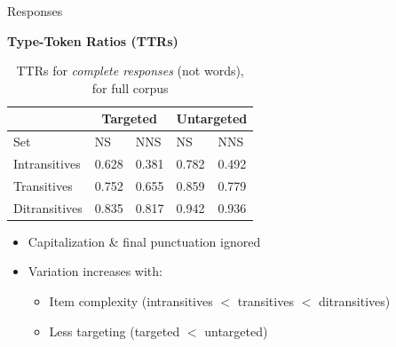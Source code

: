 \documentclass[final,14pt,t]{beamer}
\begin{document}
\begin{frame}{}
\begin{columns}[t]
\begin{column}{.33\linewidth}
\begin{minipage}[t][\textheight]{\linewidth}
\begin{block}{Responses}
\begin{center}
\begin{minipage}{.85\textwidth}
\vspace{1.3em}

\begin{center}
  \textbf{Type-Token Ratios (TTRs)}
\end{center}

\begin{table}[h!]
\begin{center}
\setlength{\tabcolsep}{0.65em}
\begin{tabular}{|l||l|l||l|l|}
\hline
 & \multicolumn{2}{|c||}{Targeted} & \multicolumn{2}{|c|}{Untargeted} \\
\hline
 Set & NS & NNS & NS & NNS \\
\hline
\hline
Intransitives & 0.628 & 0.381 & 0.782 & 0.492 \\
\hline
Transitives & 0.752 & 0.655 & 0.859 & 0.779 \\
\hline
Ditransitives & 0.835 & 0.817 & 0.942 & 0.936 \\ 
\hline
\end{tabular}
\caption{\label{tab:ttr} TTRs for \textit{complete responses} (not words), for full corpus}
\end{center}
\end{table}

\begin{itemize}
\item Capitalization \& final punctuation ignored
\vspace{.3em}
\item Variation increases with:
  \begin{itemize}
  \vspace{.3em}
  \item Item complexity (intransitives $<$ transitives $<$ ditransitives)
  \vspace{.3em}
  \item Less targeting (targeted $<$ untargeted)
  \end{itemize}
\end{itemize}
\vspace{1em}


\end{minipage}
\end{center}
\end{block}
\end{minipage}
\end{column}
\end{columns}
\end{frame}
\end{document}
